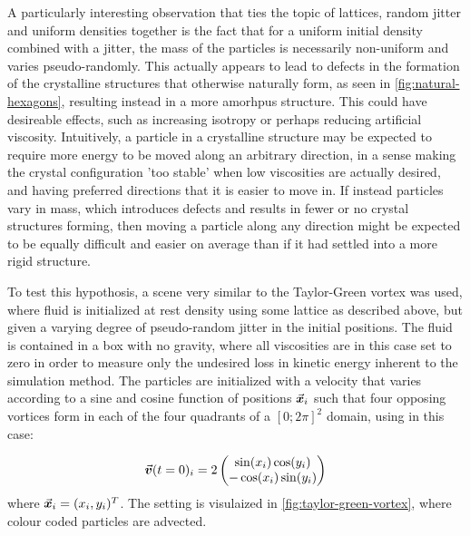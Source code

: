 A particularly interesting observation that ties the topic of lattices, random jitter and uniform densities together is the fact that for a uniform initial density combined with a jitter, the mass of the particles is necessarily non-uniform and varies pseudo-randomly. This actually appears to lead to defects in the formation of the crystalline structures that otherwise naturally form, as seen in \autoref{fig:natural-hexagons}, resulting instead in a more amorhpus structure. This could have desireable effects, such as increasing isotropy or perhaps reducing artificial viscosity. Intuitively, a particle in a crystalline structure may be expected to require more energy to be moved along an arbitrary direction, in a sense making the crystal configuration 'too stable' when low viscosities are actually desired, and having preferred directions that it is easier to move in. If instead particles vary in mass, which introduces defects and results in fewer or no crystal structures forming, then moving a particle along any direction might be expected to be equally difficult and easier on average than if it had settled into a more rigid structure.

To test this hypothosis, a scene very similar to the Taylor-Green vortex was used, where fluid is initialized at rest density using some lattice as described above, but given a varying degree of pseudo-random jitter in the initial positions. The fluid is contained in a box with no gravity, where all viscosities are in this case set to zero in order to measure only the undesired loss in kinetic energy inherent to the simulation method. The particles are initialized with a velocity that varies according to a sine and cosine function of positions $\vec{\bm{x}}_i$ such that four opposing vortices form in each of the four quadrants of a $[0;2\pi]^2$ domain, using in this case\autocite*{taylor-green-arxiv}:

\begin{equation}
  \vec{\bm{v}}(t=0)_i = 2\begin{pmatrix}
    \sin(x_i) \cos(y_i) \\
    -\cos(x_i) \sin(y_i)
  \end{pmatrix}
\end{equation}
where $\vec{\bm{x}}_i = (x_i, y_i)^T$. The setting is visulaized in \autoref{fig:taylor-green-vortex}, where colour coded particles are advected.

